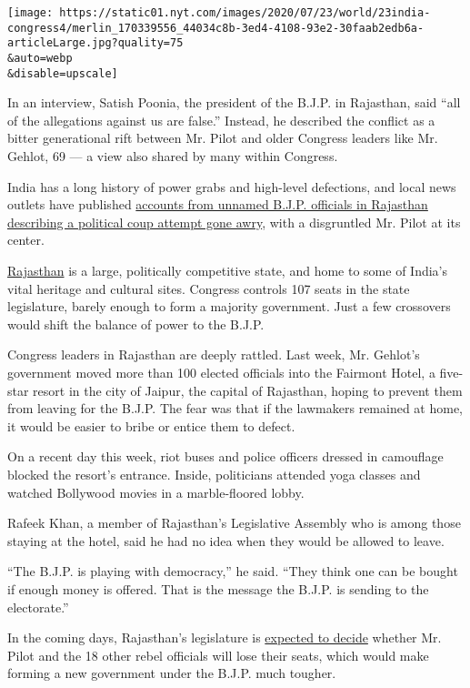 \texttt{[image: https://static01.nyt.com/images/2020/07/23/world/23india-congress4/merlin\_170339556\_44034c8b-3ed4-4108-93e2-30faab2edb6a-articleLarge.jpg?quality=75\\\&auto=webp\\\&disable=upscale]}

In an interview, Satish Poonia, the president of the B.J.P. in
Rajasthan, said ``all of the allegations against us are false.''
Instead, he described the conflict as a bitter generational rift between
Mr. Pilot and older Congress leaders like Mr. Gehlot, 69 --- a view also
shared by many within Congress.

India has a long history of power grabs and high-level defections, and
local news outlets have published
\href{https://www.indiatoday.in/india-today-insight/story/was-sachin-pilot-working-with-the-bjp-1701025-2020-07-16}{accounts
from unnamed B.J.P. officials in Rajasthan describing a political coup
attempt gone awry}, with a disgruntled Mr. Pilot at its center.

\href{https://www.ndtv.com/india-news/rajasthan-action-today-3rd-congress-meet-court-battle-2266139}{Rajasthan}
is a large, politically competitive state, and home to some of India's
vital heritage and cultural sites. Congress controls 107 seats in the
state legislature, barely enough to form a majority government. Just a
few crossovers would shift the balance of power to the B.J.P.

Congress leaders in Rajasthan are deeply rattled. Last week, Mr.
Gehlot's government moved more than 100 elected officials into the
Fairmont Hotel, a five-star resort in the city of Jaipur, the capital of
Rajasthan, hoping to prevent them from leaving for the B.J.P. The fear
was that if the lawmakers remained at home, it would be easier to bribe
or entice them to defect.

On a recent day this week, riot buses and police officers dressed in
camouflage blocked the resort's entrance. Inside, politicians attended
yoga classes and watched Bollywood movies in a marble-floored lobby.

Rafeek Khan, a member of Rajasthan's Legislative Assembly who is among
those staying at the hotel, said he had no idea when they would be
allowed to leave.

``The B.J.P. is playing with democracy,'' he said. ``They think one can
be bought if enough money is offered. That is the message the B.J.P. is
sending to the electorate.''

In the coming days, Rajasthan's legislature is
\href{https://www.news18.com/news/politics/relief-for-sachin-pilot-as-rajasthan-high-court-says-no-action-against-rebel-mlas-till-friday-2727109.html}{expected
to decide} whether Mr. Pilot and the 18 other rebel officials will lose
their seats, which would make forming a new government under the B.J.P.
much tougher.

